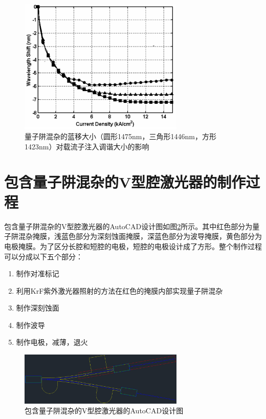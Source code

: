\documentclass[oneside]{ZJUthesis}
\begin{document}
\begin{figure}[!h]
    \centering
    \includegraphics[width=0.7\textwidth]{./Pictures/qwi_tuning.eps}
    \caption{量子阱混杂的蓝移大小（圆形1475nm，三角形1446nm，方形1423nm）对载流子注入调谐大小的影响}
    \label{fig_qwi_tuning}
\end{figure}

\section{包含量子阱混杂的V型腔激光器的制作过程}

包含量子阱混杂的V型腔激光器的AutoCAD设计图如图\ref{fig_vccl_design}所示。其中红色部分为量子阱混杂掩膜，浅蓝色部分为深刻蚀面掩膜，深蓝色部分为波导掩膜，黄色部分为电极掩膜。为了区分长腔和短腔的电极，短腔的电极设计成了方形。整个制作过程可以分成以下五个部分：

\begin{enumerate}
\item{制作对准标记}
\item{利用KrF紫外激光器照射的方法在红色的掩膜内部实现量子阱混杂}
\item{制作深刻蚀面}
\item{制作波导}
\item{制作电极，减薄，退火}
\end{enumerate}


\begin{figure}[!h]
    \centering
    \includegraphics[width=0.7\textwidth]{./Pictures/vccl_design.eps}
    \caption{包含量子阱混杂的V型腔激光器的AutoCAD设计图}
    \label{fig_vccl_design}
\end{figure}
\end{document}
